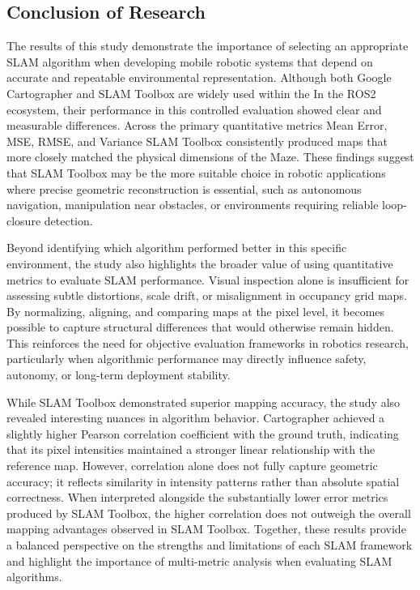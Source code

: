 \documentclass[runningheads,11pt]{llncs_bigfont_absbib}
\begin{document}
\subsection{Conclusion of Research}
The results of this study demonstrate the importance of selecting an appropriate SLAM algorithm
when developing mobile robotic systems that depend on accurate and repeatable environmental
representation. Although both Google Cartographer and SLAM Toolbox are widely used within the
In the ROS2 ecosystem, their performance in this controlled evaluation showed clear and measurable
differences. Across the primary quantitative metrics Mean Error, MSE, RMSE, and Variance
SLAM Toolbox consistently produced maps that more closely matched the physical dimensions of
the Maze. These findings suggest that SLAM Toolbox may be the more suitable choice in robotic
applications where precise geometric reconstruction is essential, such as autonomous navigation,
manipulation near obstacles, or environments requiring reliable loop-closure detection.

Beyond identifying which algorithm performed better in this specific environment, the study also
highlights the broader value of using quantitative metrics to evaluate SLAM performance. Visual
inspection alone is insufficient for assessing subtle distortions, scale drift, or misalignment in
occupancy grid maps. By normalizing, aligning, and comparing maps at the pixel level, it becomes
possible to capture structural differences that would otherwise remain hidden. This reinforces the
need for objective evaluation frameworks in robotics research, particularly when algorithmic
performance may directly influence safety, autonomy, or long-term deployment stability.

While SLAM Toolbox demonstrated superior mapping accuracy, the study also revealed
interesting nuances in algorithm behavior. Cartographer achieved a slightly higher Pearson
correlation coefficient with the ground truth, indicating that its pixel intensities maintained a
stronger linear relationship with the reference map. However, correlation alone does not fully
capture geometric accuracy; it reflects similarity in intensity patterns rather than absolute spatial
correctness. When interpreted alongside the substantially lower error metrics produced by SLAM
Toolbox, the higher correlation does not outweigh the overall mapping advantages observed in
SLAM Toolbox. Together, these results provide a balanced perspective on the strengths and
limitations of each SLAM framework and highlight the importance of multi-metric analysis when
evaluating SLAM algorithms.
\end{document}
